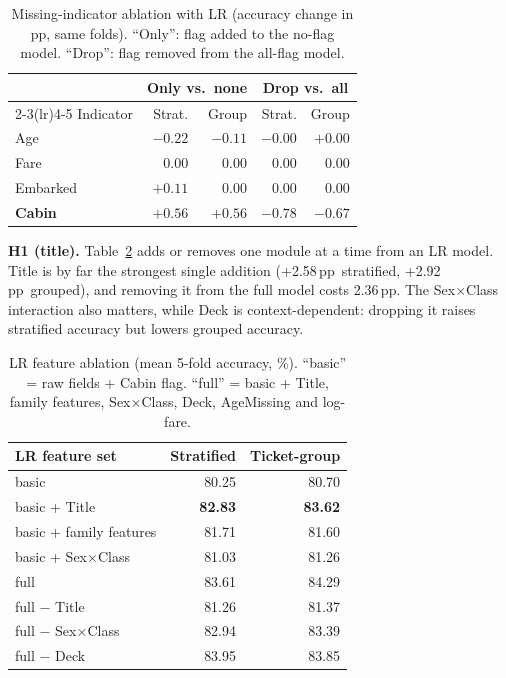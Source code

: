 \documentclass[10pt,twocolumn,letterpaper]{article}
\newcommand{\pp}{\,pp}
\begin{document}
\begin{table}[t]
\centering\small
\caption{Missing-indicator ablation with LR (accuracy change in pp, same folds). ``Only'': flag added to the no-flag model. ``Drop'': flag removed from the all-flag model.}
\label{tab:h2}
\begin{tabular}{lrrrr}
\toprule
 & \multicolumn{2}{c}{Only vs.\ none} & \multicolumn{2}{c}{Drop vs.\ all}\\
\cmidrule(lr){2-3}\cmidrule(lr){4-5}
Indicator & Strat. & Group & Strat. & Group\\
\midrule
Age      & $-0.22$ & $-0.11$ & $-0.00$ & $+0.00$\\
Fare     & $0.00$ & $0.00$ & $0.00$ & $0.00$\\
Embarked & $+0.11$ & $0.00$ & $0.00$ & $0.00$\\
\textbf{Cabin} & $\mathbf{+0.56}$ & $\mathbf{+0.56}$ & $\mathbf{-0.78}$ & $\mathbf{-0.67}$\\
\bottomrule
\end{tabular}
\end{table}

\textbf{H1 (title).} Table~\ref{tab:h1} adds or removes one module at a time from an LR model. Title is by far the strongest single addition (+2.58\pp\ stratified, +2.92\pp\ grouped), and removing it from the full model costs 2.36\pp. The Sex$\times$Class interaction also matters, while Deck is context-dependent: dropping it raises stratified accuracy but lowers grouped accuracy.

\begin{table}[t]
\centering\small
\caption{LR feature ablation (mean 5-fold accuracy, \%). ``basic'' = raw fields + Cabin flag. ``full'' = basic + Title, family features, Sex$\times$Class, Deck, AgeMissing and log-fare.}
\label{tab:h1}
\begin{tabular}{lrr}
\toprule
LR feature set & Stratified & Ticket-group\\
\midrule
basic & 80.25 & 80.70\\
basic + Title & \textbf{82.83} & \textbf{83.62}\\
basic + family features & 81.71 & 81.60\\
basic + Sex$\times$Class & 81.03 & 81.26\\
\midrule
full & 83.61 & 84.29\\
full $-$ Title & 81.26 & 81.37\\
full $-$ Sex$\times$Class & 82.94 & 83.39\\
full $-$ Deck & 83.95 & 83.85\\
\bottomrule
\end{tabular}
\end{table}
\end{document}

